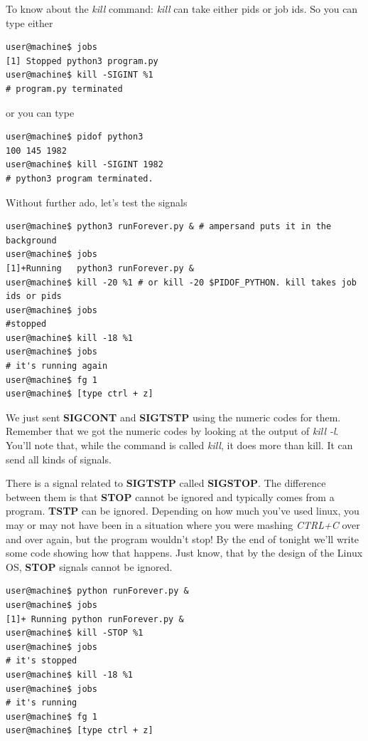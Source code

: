 \documentclass[8pt]{article}
\begin{document}
To know about the \textit{kill} command: \textit{kill} can take either pids or
job ids. So you can type either

\begin{lstlisting}[style=term]
user@machine$ jobs
[1] Stopped python3 program.py
user@machine$ kill -SIGINT %1
# program.py terminated
\end{lstlisting}

or you can type

\begin{lstlisting}[style=term]
user@machine$ pidof python3
100 145 1982
user@machine$ kill -SIGINT 1982
# python3 program terminated.
\end{lstlisting}

Without further ado, let's test the signals

\begin{lstlisting}
user@machine$ python3 runForever.py & # ampersand puts it in the background
user@machine$ jobs
[1]+Running   python3 runForever.py &
user@machine$ kill -20 %1 # or kill -20 $PIDOF_PYTHON. kill takes job ids or pids
user@machine$ jobs
#stopped
user@machine$ kill -18 %1
user@machine$ jobs
# it's running again
user@machine$ fg 1
user@machine$ [type ctrl + z]
\end{lstlisting}

We just sent \textbf{SIGCONT} and \textbf{SIGTSTP} using the numeric codes for them. Remember that we got the numeric codes by looking at the output of \textit{kill -l}. You'll note that, while the command is called \textit{kill}, it does more than kill. It can send all kinds of signals.

There is a signal related to \textbf{SIGTSTP} called \textbf{SIGSTOP}.
The difference between them is that \textbf{STOP} cannot be ignored and typically comes from a program. \textbf{TSTP} can be ignored. Depending on how much you've used linux, you may or may  not have been in a situation where you were mashing \textit{CTRL+C} over and over again, but the program wouldn't stop! By the end of tonight we'll write some code showing how that happens. Just know, that by the design of the Linux OS, \textbf{STOP} signals cannot be ignored.

\begin{lstlisting}
user@machine$ python runForever.py &
user@machine$ jobs
[1]+ Running python runForever.py &
user@machine$ kill -STOP %1
user@machine$ jobs
# it's stopped
user@machine$ kill -18 %1
user@machine$ jobs 
# it's running
user@machine$ fg 1
user@machine$ [type ctrl + z]
\end{lstlisting}
\end{document}
